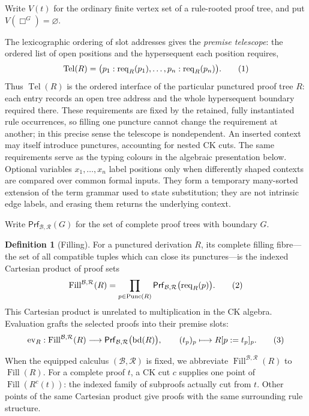 \documentclass[10pt,a4paper]{article}
\theoremstyle{plain}
\theoremstyle{definition}
\newtheorem{definition}[theorem]{Definition}
\theoremstyle{remark}
\newcommand{\Base}{\mathcal B}
\newcommand{\Rules}{\mathcal R}
\newcommand{\rootseq}{\operatorname{bd}}
\newcommand{\Fill}{\operatorname{Fill}}
\newcommand{\Req}{\operatorname{req}}
\newcommand{\Punc}{\operatorname{Punc}}
\newcommand{\Tel}{\operatorname{Tel}}
\newcommand{\Prf}{\mathsf{Prf}}
\newcommand{\eqtag}{\refstepcounter{equation}\tag{\theequation}}
\begin{document}
Write \(V(t)\) for the ordinary finite vertex set of a rule-rooted proof
tree, and put \(V(\Box^G)=\varnothing\).

The lexicographic ordering of slot addresses gives the \emph{premise
telescope}: the ordered list of open positions and the hypersequent each
position requires,
\[
 \Tel(R)=
 \bigl(p_1:\Req_R(p_1),\ldots,p_n:\Req_R(p_n)\bigr).
\eqtag\label{eq:premise-telescope}
\]
Thus \(\Tel(R)\) is the ordered interface of the particular punctured
proof tree \(R\): each entry records an open tree address and the whole
hypersequent boundary required there.  These requirements are fixed by the
retained, fully instantiated rule occurrences, so filling one puncture
cannot change the requirement at another; in this precise sense the
telescope is nondependent.  An inserted context may itself introduce
punctures, accounting for nested CK cuts.  The same requirements serve as
the typing colours in the algebraic presentation below.  Optional variables
\(x_1,\ldots,x_n\) label positions only when differently shaped contexts
are compared over common formal inputs.  They form a temporary many-sorted
extension of the term grammar used to state substitution; they are not
intrinsic edge labels, and erasing them returns the underlying context.

Write \(\Prf_{\Base,\Rules}(G)\) for the set of complete proof
trees with boundary \(G\).

\begin{definition}[Filling]
\label{def:filling}
For a punctured derivation \(R\), its complete filling fibre---the set of
all compatible tuples which can close its punctures---is the indexed
Cartesian product of proof sets
\[
 \Fill^{\Base,\Rules}(R)
   =
 \prod_{p\in\Punc(R)}
   \Prf_{\Base,\Rules}\bigl(\Req_R(p)\bigr).
\eqtag\label{eq:closed-filling-fibre}
\]
This Cartesian product is unrelated to multiplication in the CK algebra.
Evaluation grafts the selected proofs into their premise slots:
\[
 \operatorname{ev}_R:
 \Fill^{\Base,\Rules}(R)
 \longrightarrow
 \Prf_{\Base,\Rules}\bigl(\rootseq(R)\bigr),\qquad
 (t_p)_p\longmapsto R[p:=t_p]_p .
\eqtag\label{eq:filling-evaluation}
\]
\end{definition}

When the equipped calculus \((\Base,\Rules)\) is fixed, we abbreviate
\(\Fill^{\Base,\Rules}(R)\) to \(\Fill(R)\).
For a complete proof \(t\), a CK cut \(c\) supplies one point of
\(\Fill(R^c(t))\): the indexed family of subproofs actually cut from
\(t\).  Other points of the same Cartesian product give proofs with the
same surrounding rule structure.
\end{document}
